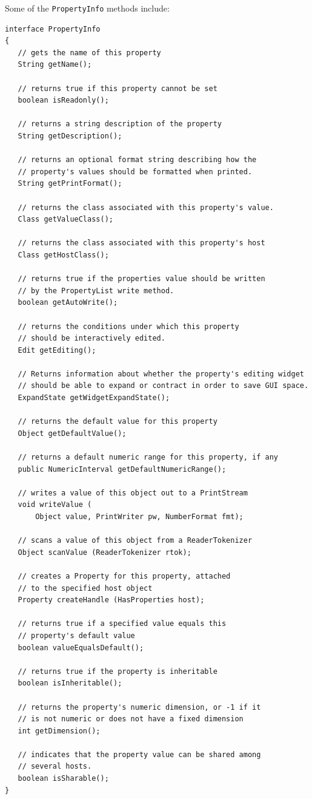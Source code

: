 \documentclass{article}
\begin{document}
Some of the {\tt PropertyInfo} methods include:
\begin{lstlisting}[]
interface PropertyInfo
{
   // gets the name of this property
   String getName(); 

   // returns true if this property cannot be set
   boolean isReadonly();

   // returns a string description of the property
   String getDescription();

   // returns an optional format string describing how the 
   // property's values should be formatted when printed.
   String getPrintFormat();
 
   // returns the class associated with this property's value.
   Class getValueClass();

   // returns the class associated with this property's host
   Class getHostClass();

   // returns true if the properties value should be written
   // by the PropertyList write method.
   boolean getAutoWrite();

   // returns the conditions under which this property 
   // should be interactively edited.
   Edit getEditing();

   // Returns information about whether the property's editing widget
   // should be able to expand or contract in order to save GUI space. 
   ExpandState getWidgetExpandState();

   // returns the default value for this property
   Object getDefaultValue();

   // returns a default numeric range for this property, if any
   public NumericInterval getDefaultNumericRange();

   // writes a value of this object out to a PrintStream
   void writeValue (
       Object value, PrintWriter pw, NumberFormat fmt);

   // scans a value of this object from a ReaderTokenizer
   Object scanValue (ReaderTokenizer rtok);

   // creates a Property for this property, attached
   // to the specified host object
   Property createHandle (HasProperties host);

   // returns true if a specified value equals this
   // property's default value
   boolean valueEqualsDefault();

   // returns true if the property is inheritable
   boolean isInheritable();

   // returns the property's numeric dimension, or -1 if it
   // is not numeric or does not have a fixed dimension
   int getDimension();

   // indicates that the property value can be shared among
   // several hosts.
   boolean isSharable();
}
\end{lstlisting}
\end{document}
